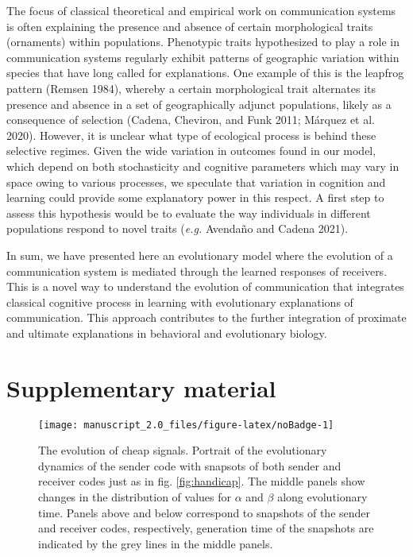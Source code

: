 \documentclass[
  12pt,
]{article}
\newcommand{\beginsupplement}{ \setcounter{table}{0}            
  \renewcommand{\thetable}{S\arabic{table}}\setcounter{figure}{0} \renewcommand{\thefigure}{S\arabic{figure}}}
\begin{document}
The focus of classical theoretical and empirical work on communication
systems is often explaining the presence and absence of certain
morphological traits (ornaments) within populations. Phenotypic traits
hypothesized to play a role in communication systems regularly exhibit
patterns of geographic variation within species that have long called
for explanations. One example of this is the leapfrog pattern (Remsen
1984), whereby a certain morphological trait alternates its presence and
absence in a set of geographically adjunct populations, likely as a
consequence of selection (Cadena, Cheviron, and Funk 2011; Márquez et
al. 2020). However, it is unclear what type of ecological process is
behind these selective regimes. Given the wide variation in outcomes
found in our model, which depend on both stochasticity and cognitive
parameters which may vary in space owing to various processes, we
speculate that variation in cognition and learning could provide some
explanatory power in this respect. A first step to assess this
hypothesis would be to evaluate the way individuals in different
populations respond to novel traits (\emph{e.g.} Avendaño and Cadena
2021).

In sum, we have presented here an evolutionary model where the evolution
of a communication system is mediated through the learned responses of
receivers. This is a novel way to understand the evolution of
communication that integrates classical cognitive process in learning
with evolutionary explanations of communication. This approach
contributes to the further integration of proximate and ultimate
explanations in behavioral and evolutionary biology.

\hypertarget{supplementary-material}{%
\section{Supplementary material}\label{supplementary-material}}

\beginsupplement

\begin{figure}

{\centering \texttt{[image: manuscript\_2.0\_files/figure-latex/noBadge-1]} 

}

\caption{The evolution of cheap signals. Portrait of the evolutionary dynamics of the sender code with snapsots of both sender and receiver codes just as in fig. \ref{fig:handicap}. The middle panels show changes in the distribution of values for $\alpha$ and $\beta$ along evolutionary time. Panels above and below correspond to snapshots of the sender and receiver codes, respectively, generation time of the snapshots are indicated by the grey lines in the middle panels.}\label{fig:noBadge}
\end{figure}
\end{document}
